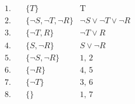 \documentclass[12pt]{article}
\begin{document}
\subsection*{}

\begin{align*}
    1. \hspace{1em} & \{ T \}                                                                   & \text{T} \\
    2. \hspace{1em} & \{ \neg S, \neg T, \neg R \}                                              & \text{$\neg S \vee \neg T \vee \neg R$} \\
    3. \hspace{1em} & \{ \neg T, R \}                                                           & \text{$\neg T \vee R$} \\
    4. \hspace{1em} & \{ S, \neg R \}                                                           & \text{$S \vee \neg R$} \\
    5. \hspace{1em} & \{ \neg S, \neg R \}                                                      & \text{1, 2} \\
    6. \hspace{1em} & \{ \neg R \}                                                              & \text{4, 5} \\
    7. \hspace{1em} & \{ \neg T \}                                                              & \text{3, 6} \\
    8. \hspace{1em} & \{ \}                                                                     & \text{1, 7} \\
\end{align*}

\subsection*{}
\end{document}
